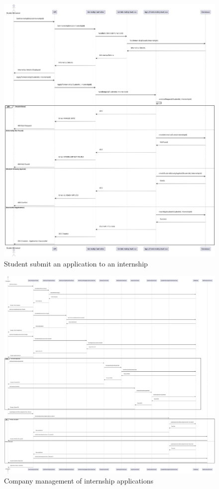 \begin{figure}[ht!]
    \centering
    \includegraphics[scale=0.28]{Images/ImagesSequenceDiagram/StudentSubmitApplication.png}
    \caption{Student submit an application to an internship}
\end{figure}

\newpage

\begin{figure}[ht!]
    \centering
    \includegraphics[scale=0.15]{Images/ImagesSequenceDiagram/CompanyManagesIncomeApplications.png}
    \caption{Company management of internship applications}
\end{figure}

